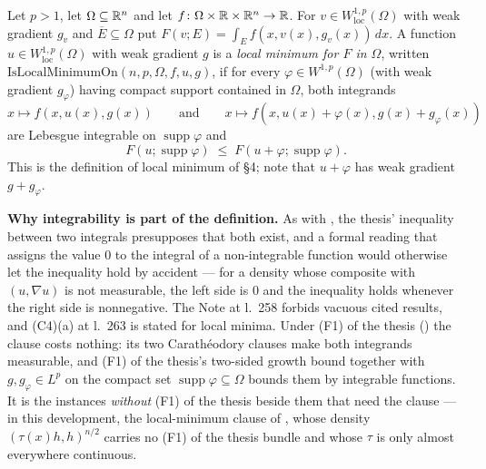 \begin{definition}
Let $p>1$, let $\Omega\subseteq\mathbb{R}^n$ and let
$f\colon\Omega\times\mathbb{R}\times\mathbb{R}^n\to\mathbb{R}$.  For $v\in W^{1,p}_{\mathrm{loc}}(\Omega)$
with weak gradient $g_v$ and $\overline E\subseteq\Omega$ put
$F(v;E)=\int_E f(x,v(x),g_v(x))\,dx$.  A function
$u\in W^{1,p}_{\mathrm{loc}}(\Omega)$ with weak gradient $g$ is a \emph{local
minimum for $F$ in $\Omega$}, written
$\mathrm{IsLocalMinimumOn}(n,p,\Omega,f,u,g)$, if for every
$\varphi\in W^{1,p}(\Omega)$ (with weak gradient $g_\varphi$) having compact
support contained in $\Omega$, both integrands
\[
x\mapsto f(x,u(x),g(x))
\qquad\text{and}\qquad
x\mapsto f(x,u(x)+\varphi(x),g(x)+g_\varphi(x))
\]
are Lebesgue integrable on $\operatorname{supp}\varphi$ and
\[
F(u;\operatorname{supp}\varphi)\;\le\;F(u+\varphi;\operatorname{supp}\varphi).
\]
This is the definition of local minimum of \S4; note that $u+\varphi$ has weak
gradient $g+g_\varphi$.

\noindent\textbf{Why integrability is part of the definition.}  As with
, the thesis' inequality between two integrals
presupposes that both exist, and a formal reading that assigns the value $0$ to
the integral of a non-integrable function would otherwise let the inequality hold
by accident --- for a density whose composite with $(u,\nabla u)$ is not
measurable, the left side is $0$ and the inequality holds whenever the right side
is nonnegative.  The Note at l.~258 forbids vacuous cited results, and (C4)(a)
at l.~263 is stated for local minima.  Under (F1) of the thesis
() the clause costs nothing: its two
Carath\'eodory clauses make both integrands measurable, and (F1) of the thesis's
two-sided growth bound together with $g,g_\varphi\in L^p$ on the compact set
$\operatorname{supp}\varphi\subseteq\Omega$ bounds them by integrable functions.
It is the instances \emph{without} (F1) of the thesis beside them that need the clause
--- in this development, the local-minimum clause of
, whose density
$(\tau(x)h,h)^{n/2}$ carries no (F1) of the thesis bundle and whose $\tau$ is only
almost everywhere continuous.
\end{definition}
